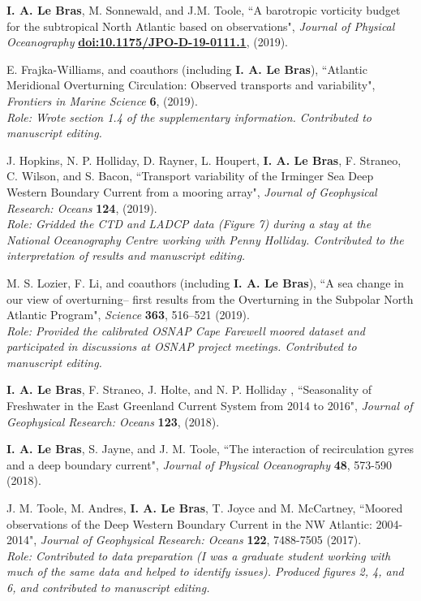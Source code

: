 \documentclass[paper=letter,fontsize=11pt]{scrartcl} %
\newcommand{\PaperEntry}[6]{
		\noindent #1, ``#2", \textit{#3} \textbf{#4}, #5 (#6).}
\begin{document}
\begin{etaremune}
\item \PaperEntry{\textbf{I. A. Le Bras}, M. Sonnewald, and J.M. Toole}{A barotropic vorticity budget for the subtropical North Atlantic based on observations}{Journal of Physical Oceanography}{\url{doi:10.1175/JPO-D-19-0111.1}}{}{2019}

\item \PaperEntry{E. Frajka-Williams, and coauthors (including \textbf{I. A. Le Bras})}{Atlantic Meridional Overturning Circulation: Observed transports and variability}{Frontiers in Marine Science}{6}{}{2019}\\
\emph{Role: Wrote section 1.4 of the supplementary information. Contributed to manuscript editing.}

\item \PaperEntry{J. Hopkins, N. P. Holliday, D. Rayner, L. Houpert, \textbf{I. A. Le Bras}, F. Straneo, C. Wilson, and S. Bacon}{Transport variability of the Irminger Sea Deep Western Boundary Current from a mooring array}{Journal of Geophysical Research: Oceans}{124}{}{2019}\\
\emph{Role: Gridded the CTD and LADCP data (Figure 7) during a stay at the National Oceanography Centre working with Penny Holliday. Contributed to the interpretation of results and manuscript editing.}

\item \PaperEntry{M. S. Lozier, F.  Li, and coauthors (including \textbf{I. A. Le Bras})}{A sea change in our view of overturning– first results from the
Overturning in the Subpolar North Atlantic Program}{Science}{363}{516--521}{2019}\\
\emph{Role: Provided the calibrated OSNAP Cape Farewell moored dataset and participated in discussions at OSNAP project meetings. Contributed to manuscript editing.}

\item \PaperEntry{\textbf{I. A. Le Bras}, F. Straneo, J. Holte, and N. P. Holliday }{Seasonality of Freshwater in the East Greenland Current
System from 2014 to 2016}{Journal of Geophysical Research: Oceans}{123}{}{2018}

\item \PaperEntry{\textbf{I. A. Le Bras}, S. Jayne, and J. M. Toole}{The interaction of recirculation gyres and a deep boundary current}{Journal of Physical Oceanography}{48}{573-590}{2018}
	
\item \PaperEntry{J. M. Toole, M. Andres, \textbf{I. A. Le Bras}, T. Joyce and M. McCartney}{Moored observations of the Deep Western Boundary Current in the NW Atlantic: 2004-2014}{ Journal of Geophysical Research: Oceans}{122}{7488-7505}{2017}\\
\emph{Role: Contributed to data preparation (I was a graduate student working with much of the same data and helped to identify issues). Produced figures 2, 4, and 6, and contributed to manuscript editing.}


\end{etaremune}
\end{document}
